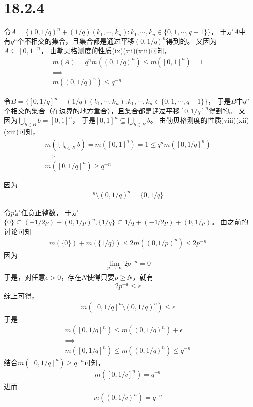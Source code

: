 \documentclass{article}
\begin{document}
\section*{18.2.4}

令$A = \{(0, 1/q)^n + (1/q)(k_1,\cdots, k_n): k_1,\cdots, k_n \in \{0, 1, \cdots, q - 1\}\}$，
于是$A$中有$q^n$个不相交的集合，且集合都是通过平移$(0, 1/q)^n$得到的。
又因为$A \subseteq [0, 1]^n$，
由勒贝格测度的性质(ix)(xii)(xiii)可知，
\begin{align*}
  m(A) = q^n m((0, 1/q)^n) \leq m([0, 1]^n) = 1 \\
  \implies                                      \\
  m((0, 1/q)^n) \leq q^{-n}
\end{align*}

令$B = \{[0, 1/q]^n + (1/q)(k_1,\cdots, k_n): k_1,\cdots, k_n \in \{0, 1, \cdots, q - 1\}\}$，
于是$B$中$q^n$个相交的集合（在边界的地方重合），且集合都是通过平移$[0, 1/q]^n$得到的。
又因为$\bigcup\limits_{b \in B}  b = [0, 1]^n$，
于是$[0, 1]^n \subseteq \bigcup\limits_{b \in B}  b$。
由勒贝格测度的性质(viii)(xii)(xiii)可知，
\begin{align*}
  m(\bigcup\limits_{b \in B}  b) = m([0, 1]^n) = 1 \leq q^n m([0, 1/q]^n) \\
  \implies                                                                \\
  m([0, 1/q]^n) \geq q^{-n}
\end{align*}

因为
\begin{align*}
  [0, 1/q]^n \setminus (0, 1/q)^n = \{0, 1/q\}
\end{align*}

令$p$是任意正整数，
于是$\{0\} \subseteq (-1/2p) + (0, 1/p)^n, \{1/q\} \subseteq 1/q + (-1/2p) + (0, 1/p)$。
由之前的讨论可知
\begin{align*}
  m(\{0\}) + m(\{1/q\}) \leq 2 m((0, 1/p)^n) \leq 2 p^{-n}
\end{align*}
因为
\begin{align*}
  \lim\limits_{p \to \infty} 2 p^{-n} = 0
\end{align*}
于是，对任意$\epsilon > 0$，存在$N$使得只要$p \geq N$，就有
\begin{align*}
  2 p^{-n} \leq \epsilon
\end{align*}
综上可得，
\begin{align*}
  m([0, 1/q]^n \setminus (0, 1/q)^n) \leq \epsilon
\end{align*}
于是
\begin{align*}
  m([0, 1/q]^n) \leq m((0, 1/q)^n) + \epsilon \\
  \implies                                    \\
  m([0, 1/q]^n) \leq m((0, 1/q)^n) \leq q^{-n}
\end{align*}
结合$m([0, 1/q]^n) \geq q^{-n}$可知，
\begin{align*}
  m([0, 1/q]^n) = q^{-n}
\end{align*}
进而
\begin{align*}
  m((0, 1/q)^n) = q^{-n}
\end{align*}
\end{document}

